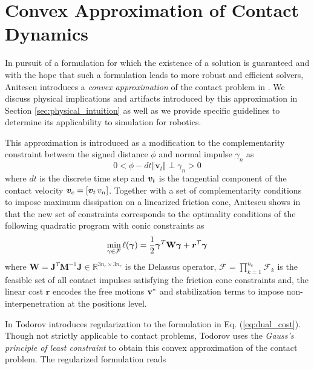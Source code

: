 \section{Convex Approximation of Contact Dynamics}
\label{sec:previous_work}

In pursuit of a formulation for which the existence of a solution is guaranteed
and with the hope that such a formulation leads to more robust and efficient
solvers, Anitescu introduces a \textit{convex approximation} of the contact
problem in \cite{bib:anitescu2006}. We discuss physical implications and
artifacts introduced by this approximation in Section
\ref{sec:physical_intuition} as well as we provide specific guidelines to
determine its applicability to simulation for robotics.

This approximation is introduced as a
modification to the complementarity constraint between the signed distance
$\phi$ and normal impulse
$\gamma_n$ as
\begin{equation}
	0 < \phi - dt \Vert {\bm v}_t \Vert \perp \gamma_n > 0
	\label{eq:convex_approximation_complementarity_condition}
\end{equation}
where $dt$ is the discrete time step and ${\bm{v}}_t$ is the tangential component
of the contact velocity ${\bm{v}}_c = [{\bm{v}}_t\,v_n]$. Together with a set of
complementarity conditions to impose maximum dissipation on a linearized
friction cone, Anitescu shows in \cite{bib:anitescu2006} that the new set of
constraints corresponds to the optimality conditions of the following quadratic
program with conic constraints as
\begin{eqnarray}
	\min_{\gamma\in \mathcal{F}} \ell(\bgamma) =
	\frac{1}{2}\bgamma^T\mathbf{W}\bgamma + {\bm r}^T
	\bgamma
	\label{eq:dual_cost}
\end{eqnarray}
where $\mathbf{W} =
\mathbf{J}^T\mathbf{M}^{-1}\mathbf{J}\in\mathbb{R}^{3n_c\times 3n_c}$ is the
Delassus operator, $\mathcal{F}=\prod_{k=1}^{n_c}\mathcal{F}_k$ is the feasible
set of all contact impulses satisfying the friction cone constraints and, the
linear cost ${\bm r}$ encodes the free motions ${\mathbf{v}}^*$ and stabilization
terms to impose non-interpenetration at the positions level.

In \cite{bib:todorov2011, bib:todorov2014} Todorov introduces regularization to
the formulation in Eq. (\ref{eq:dual_cost}). Though not strictly applicable to
contact problems, Todorov uses the \textit{Gauss's principle of least
constraint} to obtain this convex approximation of the contact problem. The
regularized formulation reads

